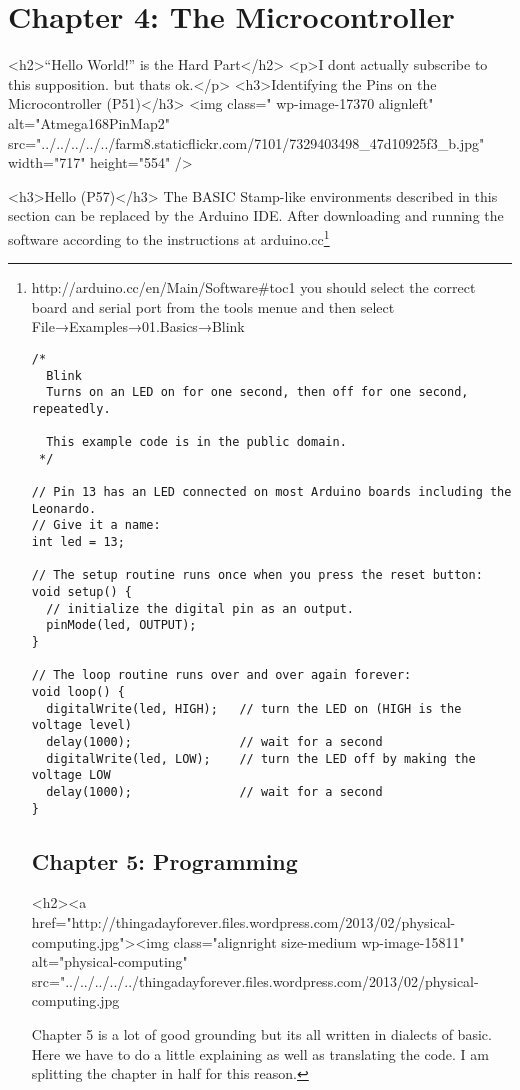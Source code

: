 \documentclass{article}
\begin{document}
\section{Chapter 4: The Microcontroller}
<h2>``Hello World!'' is the Hard Part</h2>
<p>I dont actually subscribe to this supposition. but thats ok.</p>
<h3>Identifying the Pins on the Microcontroller (P51)</h3>
<img class=" wp-image-17370 alignleft" alt="Atmega168PinMap2" src="../../../../../farm8.staticflickr.com/7101/7329403498_47d10925f3_b.jpg" width="717" height="554" />

<h3>Hello (P57)</h3>
The BASIC Stamp-like environments described in this section can be replaced by the Arduino IDE. After downloading and running the software according to the instructions at arduino.cc\footnote{http://arduino.cc/en/Main/Software#toc1 you should select the correct board and serial port from the tools menue and then select
File→Examples→01.Basics→Blink

\begin{verbatim}
/*
  Blink
  Turns on an LED on for one second, then off for one second, repeatedly.

  This example code is in the public domain.
 */

// Pin 13 has an LED connected on most Arduino boards including the Leonardo.
// Give it a name:
int led = 13;

// The setup routine runs once when you press the reset button:
void setup() {                
  // initialize the digital pin as an output.
  pinMode(led, OUTPUT);
}

// The loop routine runs over and over again forever:
void loop() {
  digitalWrite(led, HIGH);   // turn the LED on (HIGH is the voltage level)
  delay(1000);               // wait for a second
  digitalWrite(led, LOW);    // turn the LED off by making the voltage LOW
  delay(1000);               // wait for a second
}
\end{verbatim}
\endsection
\section{Chapter 5: Programming}
<h2><a href="http://thingadayforever.files.wordpress.com/2013/02/physical-computing.jpg"><img class="alignright size-medium wp-image-15811" alt="physical-computing" src="../../../../../thingadayforever.files.wordpress.com/2013/02/physical-computing.jpg%

Chapter 5 is a lot of good grounding but its all written in dialects of basic. Here we have to do a little explaining as well as translating the code. I am splitting the chapter in half for this reason.

}
\end{document}
